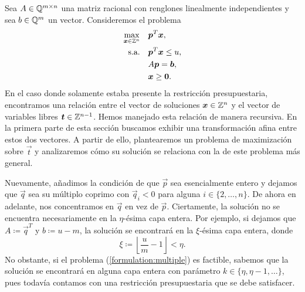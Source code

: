Sea $A \in \mathbb{Q}^{m \times n}$ una matriz racional con renglones linealmente independientes y sea $b
\in \mathbb{Q}^m$ un vector. Consideremos el problema
\begin{subequations}
	\label{formulation:multiple}
	\begin{align}
		\max_{\boldsymbol{x} \in \mathbb{Z}^n} \quad
			& \boldsymbol{p}^T\boldsymbol{x}, \label{formulation:multiple:objective} \\
		\text{s.a.} \quad
			& \boldsymbol{p}^T\boldsymbol{x} \leq u, \label{formulation:multiple:constraint:budget} \\
			& A\boldsymbol{p} = \boldsymbol{b}, \label{formulation:multiple:constraints} \\
			& \boldsymbol{x} \geq \boldsymbol{0}. \nonumber
	\end{align}
\end{subequations}
En el caso donde solamente estaba presente la restricción presupuestaria, encontramos una relación
entre el vector de soluciones $\boldsymbol{x} \in \mathbb{Z}^n$ y el vector de variables libres $\boldsymbol{t} \in
\mathbb{Z}^{n-1}$. Hemos manejado esta relación de manera recursiva. En la primera parte de esta sección
buscamos exhibir una transformación afina entre estos dos vectores. A partir de ello, plantearemos
un problema de maximización sobre $\vec{t}$ y analizaremos cómo su solución se relaciona con la de
este problema más general.

Nuevamente, añadimos la condición de que $\vec{p}$ sea esencialmente entero y dejamos que $\vec{q}$
sea su múltiplo coprimo con $\vec{q}_i < 0$ para alguna $i \in \lbrace 2, \ldots, n \rbrace$. De
ahora en adelante, nos concentramos en $\vec{q}$ en vez de $\vec{p}$. Ciertamente, la solución no se
encuentra necesariamente en la $\eta$-ésima capa entera. Por ejemplo, si dejamos que $A \coloneq
\vec{q}^T$ y $b \coloneq u - m$, la solución se encontrará en la $\xi$-ésima capa entera, donde
\begin{equation*}
	\xi \coloneq \left\lfloor \frac{u}{m} - 1 \right\rfloor < \eta.
\end{equation*}
No obstante, si el problema (\ref{formulation:multiple}) es factible, sabemos que la solución se
encontrará en alguna capa entera con parámetro $k \in \lbrace \eta, \eta - 1, \ldots \rbrace$, pues
todavía contamos con una restricción presupuestaria que se debe satisfacer.

